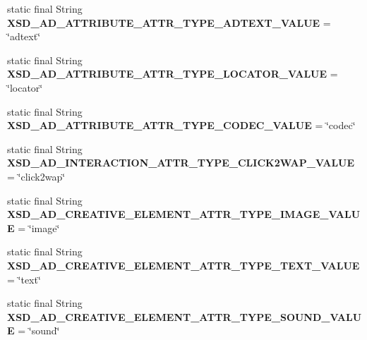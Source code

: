 \begin{DoxyCompactItemize}
\item 
\hypertarget{classcom_1_1bluevia_1_1commons_1_1parser_1_1xml_1_1XmlConstants_aaee56d1d6a060f34c9ac6988b87dee98}{
static final String {\bfseries XSD\_\-AD\_\-ATTRIBUTE\_\-ATTR\_\-TYPE\_\-ADTEXT\_\-VALUE} = \char`\"{}adtext\char`\"{}}
\label{classcom_1_1bluevia_1_1commons_1_1parser_1_1xml_1_1XmlConstants_aaee56d1d6a060f34c9ac6988b87dee98}

\item 
\hypertarget{classcom_1_1bluevia_1_1commons_1_1parser_1_1xml_1_1XmlConstants_afb89219babe1ab33bcb03184797f9a92}{
static final String {\bfseries XSD\_\-AD\_\-ATTRIBUTE\_\-ATTR\_\-TYPE\_\-LOCATOR\_\-VALUE} = \char`\"{}locator\char`\"{}}
\label{classcom_1_1bluevia_1_1commons_1_1parser_1_1xml_1_1XmlConstants_afb89219babe1ab33bcb03184797f9a92}

\item 
\hypertarget{classcom_1_1bluevia_1_1commons_1_1parser_1_1xml_1_1XmlConstants_aa003dc5a608d09874cd53b52ddd4f493}{
static final String {\bfseries XSD\_\-AD\_\-ATTRIBUTE\_\-ATTR\_\-TYPE\_\-CODEC\_\-VALUE} = \char`\"{}codec\char`\"{}}
\label{classcom_1_1bluevia_1_1commons_1_1parser_1_1xml_1_1XmlConstants_aa003dc5a608d09874cd53b52ddd4f493}

\item 
\hypertarget{classcom_1_1bluevia_1_1commons_1_1parser_1_1xml_1_1XmlConstants_ac4b2ca61b166a03c51bc4a7ecc92a678}{
static final String {\bfseries XSD\_\-AD\_\-INTERACTION\_\-ATTR\_\-TYPE\_\-CLICK2WAP\_\-VALUE} = \char`\"{}click2wap\char`\"{}}
\label{classcom_1_1bluevia_1_1commons_1_1parser_1_1xml_1_1XmlConstants_ac4b2ca61b166a03c51bc4a7ecc92a678}

\item 
\hypertarget{classcom_1_1bluevia_1_1commons_1_1parser_1_1xml_1_1XmlConstants_acee9b8752bf41c48b104ac14d44c56a7}{
static final String {\bfseries XSD\_\-AD\_\-CREATIVE\_\-ELEMENT\_\-ATTR\_\-TYPE\_\-IMAGE\_\-VALUE} = \char`\"{}image\char`\"{}}
\label{classcom_1_1bluevia_1_1commons_1_1parser_1_1xml_1_1XmlConstants_acee9b8752bf41c48b104ac14d44c56a7}

\item 
\hypertarget{classcom_1_1bluevia_1_1commons_1_1parser_1_1xml_1_1XmlConstants_ae5aace21d5bc1b4f7ea32098a71a5135}{
static final String {\bfseries XSD\_\-AD\_\-CREATIVE\_\-ELEMENT\_\-ATTR\_\-TYPE\_\-TEXT\_\-VALUE} = \char`\"{}text\char`\"{}}
\label{classcom_1_1bluevia_1_1commons_1_1parser_1_1xml_1_1XmlConstants_ae5aace21d5bc1b4f7ea32098a71a5135}

\item 
\hypertarget{classcom_1_1bluevia_1_1commons_1_1parser_1_1xml_1_1XmlConstants_a406d75feceeda2805c656b943629f2c3}{
static final String {\bfseries XSD\_\-AD\_\-CREATIVE\_\-ELEMENT\_\-ATTR\_\-TYPE\_\-SOUND\_\-VALUE} = \char`\"{}sound\char`\"{}}
\label{classcom_1_1bluevia_1_1commons_1_1parser_1_1xml_1_1XmlConstants_a406d75feceeda2805c656b943629f2c3}


\end{DoxyCompactItemize}
